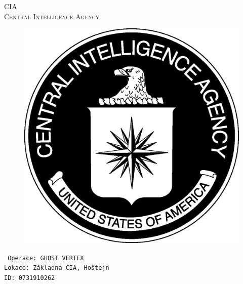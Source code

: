 \documentclass[a4paper, \fontheight]{article}
\begin{document}
	\begin{titlepage}
		\begin{center}		
			\textsc{{\fontsize{80}{0}\selectfont CIA}\\[2em]
				\Huge Central Intelligence Agency\\[2.5em]}
				
			\begin{figure}[H]
				\centering
				\includegraphics[scale=0.6]{sources/CIA_logo.eps}
			\end{figure}
		\end{center}	
		\vfill
		\noindent
		\texttt{\LARGE
				Operace: GHOST VERTEX\\[0.4em]
				Lokace: Základna CIA, Hoštejn\\[0.4em]
				ID: 0731910262}	
\end{titlepage} 
\end{document}
